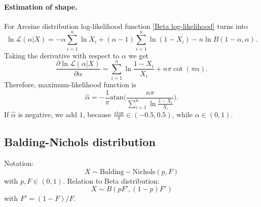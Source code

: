 \documentclass[a4paper,11pt]{article}
\theoremstyle{plain}
\theoremstyle{definition}
\begin{document}
	\paragraph{Estimation of shape.} For Arcsine distribution log-likelihood function \eqref{Beta log-likelihood} turns into
	\[
	\ln \mathcal{L} (\alpha | X) = -\alpha \sum_{i=1}^{n} \ln X_i + (\alpha - 1) \sum_{i=1}^{n}\ln (1-X_i) - n \ln B(1-\alpha, \alpha).
	\]
	Taking the derivative with respect to $\alpha$ we get
	\[ 
	\frac{\partial \ln\mathcal{L}(\alpha | X)}{\partial \alpha} = \sum_{i=1}^{n} \ln \frac{1-X_i}{X_i} + n\pi \cot(\pi \alpha).
	\]
	Therefore, maximum-likelihood function is
	\[ \hat{\alpha} = -\frac{1}{\pi} \mathrm{atan}\Bigg(\frac{n\pi}{\sum_{i=1}^{n} \ln \frac{1-X_i}{X_i}}\Bigg). \]
	If $\hat{\alpha}$ is negative, we add $1$, because $\frac{\mathrm{atan}}{\pi} \in (-0.5, 0.5)$, while $\alpha \in (0, 1)$.
	\subsection{Balding-Nichols distribution}
	Notation: \[ X \sim \mathrm{Balding-Nichols}(p, F) \] with $p, F \in (0, 1)$.
	Relation to Beta distribution: \[ X \sim B(pF', (1 - p)F') \] with $F' = (1 - F) / F$.
\end{document}

